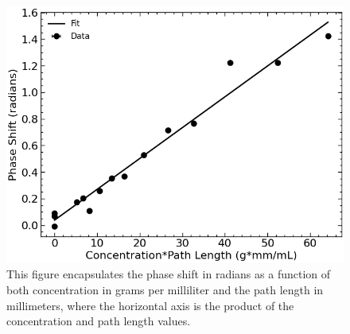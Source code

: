 \begin{figure}[H]
	\begin{center}
		\includegraphics[width=\columnwidth]{../figures/concentration_times_diameter_phase_shifts.png}
	\end{center}
	\caption{This figure encapsulates the phase shift in radians as a function of both concentration in grams per milliliter and the path length in millimeters, where the horizontal axis is the product of the concentration and path length values.}
	\label{fig:concentration_times_diameter_phase_shifts}
\end{figure}
